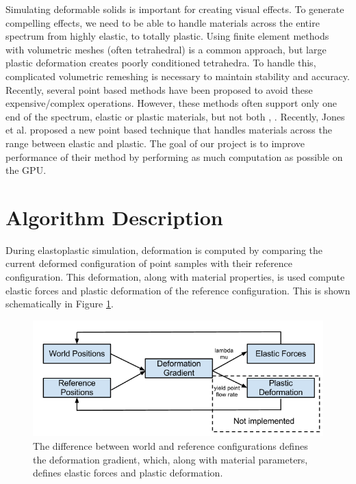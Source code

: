 \documentclass[cameraready]{acmsiggraph-awb}
\begin{document}
Simulating deformable solids is important for creating visual effects.  To generate compelling effects, we need to be able to handle materials across the entire spectrum from highly elastic, to totally plastic.  Using finite element methods with volumetric meshes (often tetrahedral) is a common approach, but large plastic deformation creates poorly conditioned tetrahedra.  To handle this, complicated volumetric remeshing is necessary to maintain stability and accuracy.  Recently, several point based methods have been proposed to avoid these expensive/complex operations.  However, these methods often support only one end of the spectrum, elastic or plastic materials, but not both  \cite{Mueller:2004:PBA}, \cite{Gerszewski:2009:APB}.  Recently, Jones et al. \cite{us} proposed a new point based technique that handles materials across the range between elastic and plastic.  The goal of our project is to improve performance of their method by performing as much computation as possible on the GPU.  

\section{Algorithm Description}

During elastoplastic simulation, deformation is computed by comparing the current deformed configuration of point samples with their reference configuration.  This deformation, along with material properties, is used compute elastic forces and plastic deformation of the reference configuration.  This is shown schematically in Figure \ref{fig:defGrad}.
\begin{figure}
\begin{centering}
\includegraphics[width = 5in]{Figures/algSchematic.png}
\caption{The difference between world and reference configurations defines the deformation gradient, which, along with material parameters, defines elastic forces and plastic deformation.}
\label{fig:defGrad}
\end{centering}
\end{figure}
\end{document}
